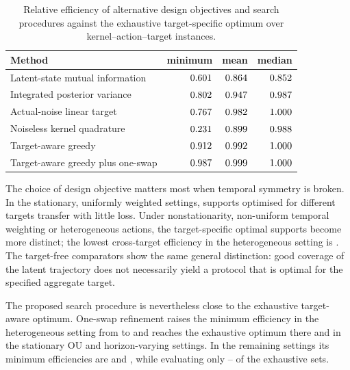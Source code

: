 \begin{table}[H]
\centering\small
\begin{tabular}{@{}lrrr@{}}
\toprule
Method & minimum & mean & median \\
\midrule
Latent-state mutual information & $0.601$ & $0.864$ & $0.852$ \\
Integrated posterior variance & $0.802$ & $0.947$ & $0.987$ \\
Actual-noise linear target & $0.767$ & $0.982$ & $1.000$ \\
Noiseless kernel quadrature & $0.231$ & $0.899$ & $0.988$ \\
Target-aware greedy & $0.912$ & $0.992$ & $1.000$ \\
Target-aware greedy plus one-swap & $0.987$ & $0.999$ & $1.000$ \\
\bottomrule
\end{tabular}
\caption{Relative efficiency of alternative design objectives and search
procedures against the exhaustive target-specific optimum over
\numDesignComparableInstances{} kernel--action--target instances.}
\label{tab:s5}
\end{table}
\FloatBarrier

The choice of design objective matters most when temporal symmetry is broken.
In the stationary, uniformly weighted settings, supports optimised for
different targets transfer with little loss. Under nonstationarity,
non-uniform temporal weighting or heterogeneous actions, the target-specific
optimal supports become more distinct; the lowest cross-target efficiency in
the heterogeneous setting is \numDesignCrossHetero. The target-free
comparators show the same general distinction: good coverage of the latent
trajectory does not necessarily yield a protocol that is optimal for the
specified aggregate target.

The proposed search procedure is nevertheless close to the exhaustive
target-aware optimum. One-swap refinement raises the minimum efficiency in the
heterogeneous setting from \numDesignGreedyMinHetero{} to
\numDesignAwareMinHetero{} and reaches the exhaustive optimum there and in the
stationary OU and horizon-varying settings. In the remaining settings its
minimum efficiencies are \numDesignAwareMinMatern{} and
\numDesignAwareMinRecency, while evaluating only
\numDesignEvalFracHetero--\numDesignEvalFracStat{} of the exhaustive sets.













